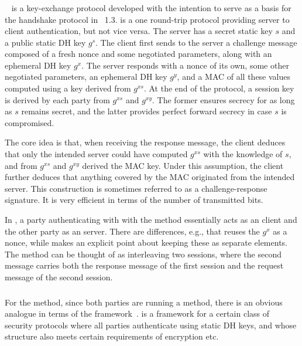 \subsubsection{\mOptls{}}
\mOptls~\cite{cryptoeprint:2015:978} is a key-exchange protocol developed {with the intention to serve as a basis for
the} handshake protocol in \mTls\ 1.3. {\mOptls{} is a one round-trip
protocol providing server to client authentication, but not vice versa.}
The server has a
secret static key $s$ and a public static DH key $g^{s}$. The client
first sends to the server a {challenge} message composed of a fresh nonce and some negotiated parameters, along with an {ephemeral DH} key $g^{x}$. The server responds with a nonce of its own, some other negotiated parameters, an {ephemeral DH} key $g^{y}$, and a MAC of all these values computed using a key derived from $g^{xs}$. At the end of the protocol, a session key is derived {by each party} from $g^{xs}$ and $g^{xy}$. The former ensures secrecy for as long as $s$ {remains secret}, and the latter provides perfect forward secrecy in case $s$ is compromised. {The core idea is that, when receiving the response message, the client deduces that only the intended server could have computed $g^{xs}$ with the knowledge of $s$,  and from $g^{xs}$ and $g^{xy}$ derived the MAC key.  Under this assumption, the client further deduces that anything covered by the MAC originated from the intended server. This construction is sometimes referred to as a challenge-response signature. It is very efficient in terms of the number of transmitted bits.

{In} \mEdhoc, a party authenticating with with the \mStat{} method essentially acts as an \mOptls{} client and the other party as an \mOptls{} server. There are differences, e.g., that \mEdhoc{} reuses
the $g^x$ as a nonce, while \mOptls{} makes an explicit point about keeping these as separate elements.  The \mStatStat{} method can be thought of as interleaving two \mOptls{} sessions{, where the second \mEdhoc{} message carries both the response message of the first \mOptls{} session and the request message of the second \mOptls{} session.}

\subsubsection{\mNoise{}}
For the \mStatStat{} method, since both parties are running a \mStat{} method,
there is an obvious analogue in terms of the \mNoise{}
framework~\cite{perrin2016noise}. \mNoise{} is a framework for a certain class
of security protocols where all parties {authenticate} using
static DH keys, and whose structure also meets certain requirements of encryption etc. 

}
